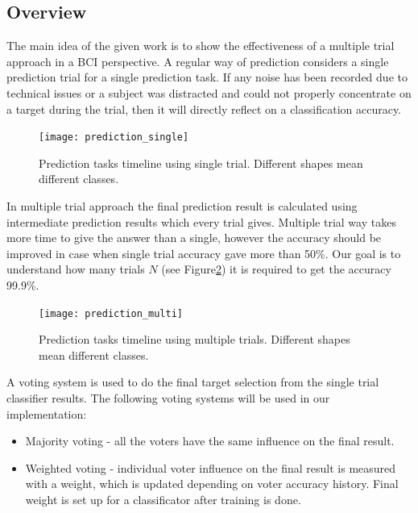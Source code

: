 \documentclass[12pt]{article}
\begin{document}
\subsection{Overview}
The main idea of the given work is to show the effectiveness of a multiple trial approach in a BCI perspective. 
A regular way of prediction considers a single prediction trial for a single prediction task. If any noise has been recorded due to technical issues or a subject was distracted and could not properly concentrate on a target during the trial, then it will directly reflect on a classification accuracy.
\begin{figure} [H]
\begin{center}
\texttt{[image: prediction\_single]}
\caption{Prediction tasks timeline using single trial. Different shapes mean different classes.}
\label{fig:fnCompModel}
\end{center}
\end{figure}

In multiple trial approach the final prediction result is calculated using intermediate prediction results which every trial gives. Multiple trial way takes more time to give the answer than a single, however the accuracy should be improved in case when single trial accuracy gave more than 50\%. Our goal is to understand how many trials $N$ (see Figure\ref{fig:prediction_multi}) it is required to get the accuracy 99.9\%.
\begin{figure} [H]
\begin{center}
\texttt{[image: prediction\_multi]}
\caption{Prediction tasks timeline using multiple trials. Different shapes mean different classes.}
\label{fig:prediction_multi}
\end{center}
\end{figure}

A voting system is used to do the final target selection from the single trial classifier results. The following voting systems will be used in our implementation:
\begin{itemize}
\item Majority voting - all the voters have the same influence on the final result.
\item Weighted voting - individual voter influence on the final result is measured with a weight, which is updated depending on voter accuracy history. Final weight is set up for a classificator after training is done.
\end{itemize}
\end{document}
